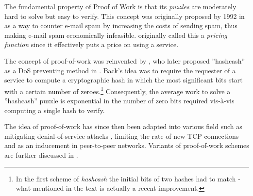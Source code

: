 

The fundamental property of Proof of Work is that its \emph{puzzles} are moderately hard to solve but easy to verify. This concept was originally proposed by \citeauthor{DworkN92} 1992 in  as a way to counter e-mail spam by increasing the costs of sending spam, thus making e-mail spam economically infeasible. \citeauthor{DworkN92} originally called this a \emph{pricing function} since it effectively puts a price on using a service.

The concept of proof-of-work was reinvented by \citeauthor{Back02}, who later proposed ''hashcash'' as a DoS preventing method in . Back's idea was to require the requester of a service to compute a cryptographic hash in which the most significant bits start with a certain number of zeroes.\footnote{In the first scheme of \emph{hashcash} the initial bits of two hashes had to match - what mentioned in the text is actually a recent improvement.} Consequently, the average work to solve a ''hashcash'' puzzle is exponential in the number of zero bits required vis-à-vis computing a single hash to verify\cite{bitcoin}.

The idea of proof-of-work has since then been adapted into various field such as mitigating denial-of-service attacks \cite{mankins}, limiting the rate of new TCP connections \cite{JuelsB99} and as an inducement in peer-to-peer networks\cite{bitcoin,p2p}. Variants of proof-of-work schemes are further discussed in .

\begin{comment}
\begin{GrayBox}[0.75\textwidth]
Impose each request with a cost (e.g. show proof of work to access a service )
\end{GrayBox}
\end{comment}

